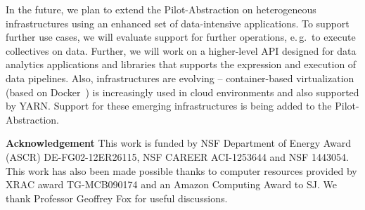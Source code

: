 \documentclass{sig-alternate}
\newcommand{\pilot}{Pilot\xspace}
\begin{document}
In the future, we plan to extend the \pilot-Abstraction on
heterogeneous infrastructures using an enhanced set of data-intensive
applications. To support further use cases, we will evaluate support
for further operations, e.\,g.\ to execute collectives on
data. Further, we will work on a higher-level API designed for data
analytics applications and libraries that supports the expression and
execution of data pipelines. Also, infrastructures are evolving --
container-based virtualization (based on Docker~\cite{docker}) is
increasingly used in cloud environments and also supported by
YARN. Support for these emerging infrastructures is being added to the
\pilot-Abstraction.


\noindent\textbf{Acknowledgement} This work is funded by NSF
Department of Energy Award (ASCR) DE-FG02-12ER26115, NSF CAREER
ACI-1253644 and NSF 1443054. This work has also been made possible
thanks to computer resources provided by XRAC award TG-MCB090174 and
an Amazon Computing Award to SJ. We thank Professor Geoffrey Fox for
useful discussions.
\end{document}
